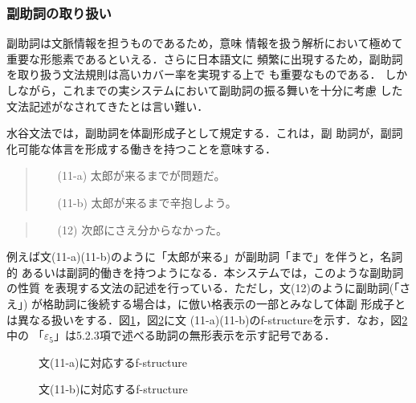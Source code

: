 \subsubsection{副助詞の取り扱い}
副助詞は文脈情報を担うものであるため，意味
情報を扱う解析において極めて重要な形態素であるといえる．さらに日本語文に
頻繁に出現するため，副助詞を取り扱う文法規則は高いカバー率を実現する上で
も重要なものである．
しかしながら，これまでの実システムにおいて副助詞の振る舞いを十分に考慮
した文法記述がなされてきたとは言い難い．

水谷文法\cite{daitai}では，副助詞を体副形成子として規定する．これは，副
助詞が，副詞化可能な体言を形成する働きを持つことを意味する．
\begin{quote}
\begin{itemize}
\item[(11-a)]太郎が来るまでが問題だ。
\item[(11-b)]太郎が来るまで辛抱しよう。
\end{itemize}
\end{quote}
\begin{quote}
\begin{itemize}
\item[(12)]次郎にさえ分からなかった。
\end{itemize}
\end{quote}
例えば文(11-a)(11-b)のように「太郎が来る」が副助詞「まで」を伴うと，名詞的
あるいは副詞的働きを持つようになる．本システムでは，このような副助詞の性質
を表現する文法の記述を行っている．ただし，文(12)のように副助詞(「さえ」)
が格助詞に後続する場合は，\cite{daitai}に倣い格表示の一部とみなして体副
形成子とは異なる扱いをする．図\ref{fig4-5a}，図\ref{fig4-5b}に文
(11-a)(11-b)のf-structureを示す．なお，図\ref{fig4-5b}中の
「$\varepsilon_5$」は5.2.3項で述べる助詞の無形表示を示す記号である．

\begin{figure}[htbp]
\center
\epsfxsize=113.9mm
\caption{文(11-a)に対応するf-structure}
\label{fig4-5a}
\end{figure}
\begin{figure}[htbp]
\center
\epsfxsize=114.1mm
\caption{文(11-b)に対応するf-structure}
\label{fig4-5b}
\end{figure}

